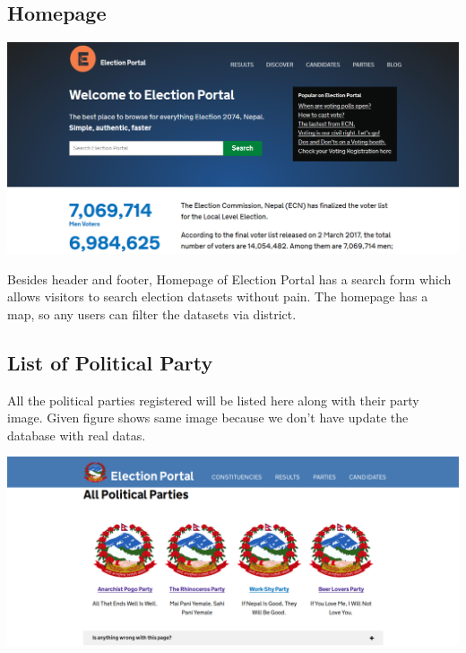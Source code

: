 \documentclass[12pt, a4paper, titlepage]{article}
\begin{document}
\subsection{Homepage}
\begin{center}
\includegraphics[scale=0.3]{home.png}\\
\end{center}
Besides header and footer, Homepage of Election Portal has a search form which allows visitors to search election datasets without pain. The homepage has a map, so any users can filter the datasets via district.

\subsection{List of Political Party}
All the political parties registered will be listed here along with their party image. Given figure shows same image because we don't have update the database with real datas.\\
\begin{center}
\includegraphics[scale=0.3]{List_of_Political_Party.png}\\
\end{center}
\end{document}
